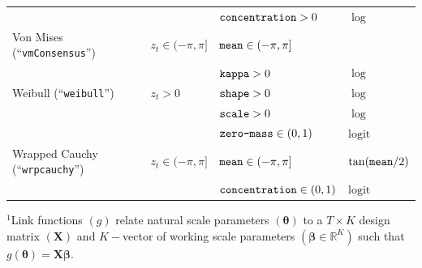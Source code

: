 \documentclass[12pt]{article}\usepackage[]{graphicx}\usepackage[]{xcolor}
\begin{document}
\begin{small}
\begin{table}
\begin{tabular}{llll}
  \rowcolor{Gray}                             &                               & $\verb|concentration|>0$                        &  $\log$ \tabularnewline 
  Von Mises (``\verb|vmConsensus|'')          & $z_t\in(-\pi,\pi]$            & $\verb|mean|\in(-\pi,\pi]$                      &  \citeauthor{RivestEtAl2016} \tabularnewline  
                                              &                               & $\verb|kappa|>0$                                &  $\log$ \tabularnewline 
  \rowcolor{Gray} Weibull (``\verb|weibull|'')& $z_t>0$                       & $\verb|shape|>0$                                &  $\log$ \tabularnewline  
  \rowcolor{Gray}                             &                               & $\verb|scale|>0$                                &  $\log$ \tabularnewline  
  \rowcolor{Gray}                             &                               & $\verb|zero-mass|\in(0,1)$                      &  $\text{logit}$ \tabularnewline 
  Wrapped Cauchy (``\verb|wrpcauchy|'')       & $z_t\in(-\pi,\pi]$            & $\verb|mean|\in(-\pi,\pi]$                      &  $\tan(\verb|mean|/2)$ \tabularnewline  
                                              &                               & $\verb|concentration|\in(0,1)$                  &  $\text{logit}$ \tabularnewline 
  \bottomrule
  \end{tabular}
  \footnotesize{$^1$Link functions $(g)$ relate natural scale parameters $({\boldsymbol \theta})$ to a $T \times K$ design matrix $({\mathbf X})$ and $K-$vector of working scale parameters $(\boldsymbol{\beta}\in \mathbb{R}^K)$ such that $g({\boldsymbol \theta})={\mathbf X}\boldsymbol{\beta}$. %
}
\end{table}
\end{small}
\end{document}
